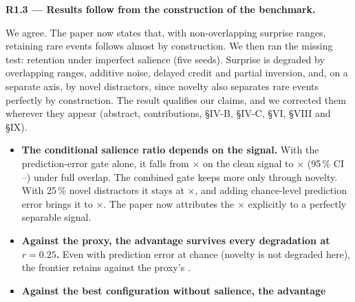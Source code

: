 \documentclass[11pt]{article}
\newcommand{\comment}[1]{\par\medskip\noindent\textbf{#1}\par}
\begin{document}
\comment{R1.3 --- Results follow from the construction of the benchmark.}
We agree. The paper now states that, with non-overlapping surprise ranges,
retaining rare events follows almost by construction. We then ran the missing
test: retention under imperfect salience (five seeds). Surprise is degraded by
overlapping ranges, additive noise, delayed credit and partial inversion, and,
on a separate axis, by novel distractors, since novelty also separates rare
events perfectly by construction. The result qualifies our claims, and we
corrected them wherever they appear (abstract, contributions, §IV-B, §IV-C, §VI,
§VIII and §IX).
\begin{itemize}
\item \textbf{The conditional salience ratio depends on the signal.} With the
prediction-error gate alone, it falls from
$\times$
on the clean signal to
$\times$
(95\,\% CI
--)
under full overlap. The combined gate keeps more only through novelty. With
25\,\% novel distractors it stays at
$\times$,
and adding chance-level prediction error brings it to
$\times$.
The paper now attributes the
$\times$ explicitly
to a perfectly separable signal.
\item \textbf{Against the proxy, the advantage survives every degradation at
$r=0.25$.} Even with prediction error at chance (novelty is not degraded
here), the frontier retains
against the proxy's
.
\item \textbf{Against the best configuration without salience, the advantage
}
\end{itemize}
\end{document}

